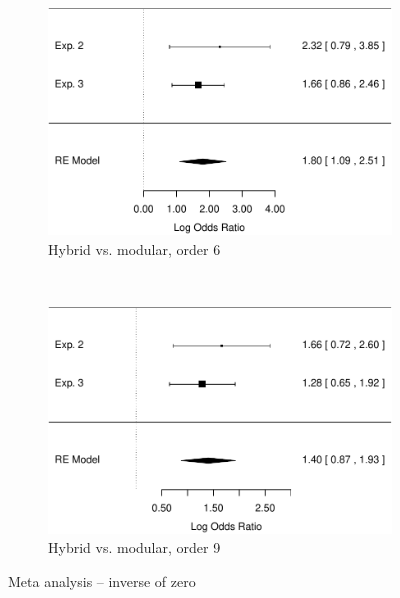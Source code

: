 \documentclass[man,10pt]{apa6}
\begin{document}
\begin{figure}
\begin{subfigure}[c]{0.4\textwidth}
\includegraphics[width=\textwidth]{figures/meta/question_typeinverse_zero_6_conditionhybrid.pdf}
\caption{Hybrid vs. modular, order 6}
\end{subfigure}
~
\begin{subfigure}[c]{0.4\textwidth}
\centering
\includegraphics[width=\textwidth]{figures/meta/question_typeinverse_zero_9_conditionhybrid.pdf}
\caption{Hybrid vs. modular, order 9}
\end{subfigure}
\caption{Meta analysis -- inverse of zero}
\label{meta_inZ}
\end{figure}\noindent 
\end{document}
